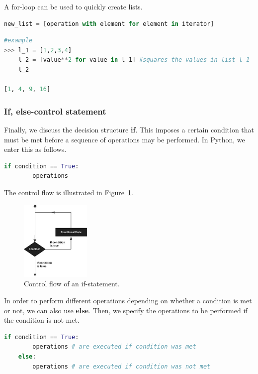 A for-loop can be used to quickly create lists.
\begin{lstlisting}[language=Python]
	new_list = [operation with element for element in iterator] 
\end{lstlisting}


\begin{lstlisting}[language=Python]
#example 
>>> l_1 = [1,2,3,4]
    l_2 = [value**2 for value in l_1] #squares the values in list l_1
    l_2

[1, 4, 9, 16]
\end{lstlisting}

\subsubsection{If, else-control statement}

Finally, we discuss the decision structure \textbf{if}. This imposes a certain condition that must be met before a sequence of operations may be performed. In Python, we enter this as follows.

\begin{lstlisting}[language=Python]
	if condition == True:
	    operations    
\end{lstlisting}

The control flow is illustrated in Figure~\ref{fig_python_3}.

\begin{figure}[H]
	\begin{center}
		\includegraphics[width=0.3\textwidth]{fig_python_3}
		\caption{Control flow of an if-statement.}
		\label{fig_python_3}
	\end{center}
\end{figure}

In order to perform different operations depending on whether a condition is met or not, we can also use \textbf{else}. Then, we specify the operations to be performed if the condition is not met.

\begin{lstlisting}[language=Python]
	if condition == True:
	    operations # are executed if condition was met
	else:
	    operations # are executed if condition was not met    
\end{lstlisting}

